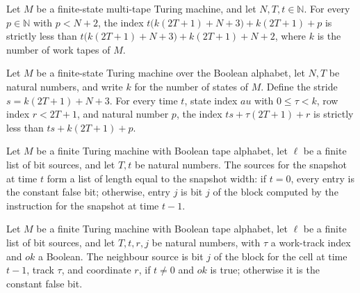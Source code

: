 \begin{theorem}
\label{Complexity.inpIdx_lt_snapIdx}
\leanok
{}
Let $M$ be a finite-state multi-tape Turing machine, and let $N,T,t\in\mathbb N$. For
every $p\in\mathbb N$ with $p<N+2$, the index $t\bigl(k(2T+1)+N+3\bigr)+k(2T+1)+p$ is
strictly less than $t\bigl(k(2T+1)+N+3\bigr)+k(2T+1)+N+2$, where $k$ is the number of
work tapes of $M$.
\end{theorem}

\begin{theorem}
\label{Complexity.cellIdx_lt_inpIdx}
\leanok
{}
Let $M$ be a finite-state Turing machine over the Boolean alphabet, let $N,T$ be natural
numbers, and write $k$ for the number of states of $M$. Define the stride
$s=k(2T+1)+N+3$. For every time $t$, state index $	au$ with $0\leq\tau<k$, row index
$r<2T+1$, and natural number $p$, the index $ts+\tau(2T+1)+r$ is strictly less than
$ts+k(2T+1)+p$.
\end{theorem}

\begin{definition}
\label{Complexity.prevSnapSrcs}
\leanok
{}
Let $M$ be a finite Turing machine with Boolean tape alphabet, let $\ell$ be a finite
list of bit sources, and let $T,t$ be natural numbers. The sources for the snapshot at
time $t$ form a list of length equal to the snapshot width: if $t=0$, every entry is the
constant false bit; otherwise, entry $j$ is bit $j$ of the block computed by the
instruction for the snapshot at time $t-1$.
\end{definition}

\begin{definition}
\label{Complexity.nbSrc}
\leanok
{}
Let $M$ be a finite Turing machine with Boolean tape alphabet, let $\ell$ be a finite
list of bit sources, and let $T,t,r,j$ be natural numbers, with $\tau$ a work-track
index and $ok$ a Boolean. The neighbour source is bit $j$ of the block for the cell at
time $t-1$, track $\tau$, and coordinate $r$, if $t\ne0$ and $ok$ is true; otherwise it
is the constant false bit.
\end{definition}

